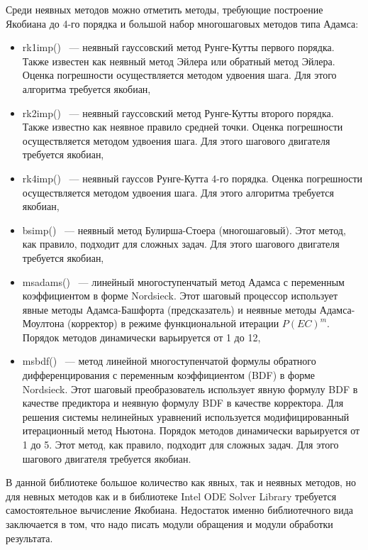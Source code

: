 Среди неявных методов можно отметить методы, требующие построение Якобиана до 4-го порядка и большой набор многошаговых методов типа
Адамса:
\begin{itemize}
    \item rk1imp() ~--- неявный гауссовский метод Рунге-Кутты первого порядка. Также известен как неявный метод Эйлера или обратный
        метод Эйлера. Оценка погрешности осуществляется методом удвоения шага. Для этого алгоритма требуется якобиан,
    \item rk2imp() ~--- неявный гауссовский метод Рунге-Кутты второго порядка. Также известно как неявное правило средней точки. Оценка
        погрешности осуществляется методом удвоения шага. Для этого шагового двигателя требуется якобиан,
    \item rk4imp() ~--- неявный гауссов Рунге-Кутта 4-го порядка. Оценка погрешности осуществляется методом удвоения шага. Для этого
        алгоритма требуется якобиан,
    \item bsimp() ~--- неявный метод Булирша-Стоера (многошаговый). Этот метод, как правило, подходит для сложных задач. Для этого
        шагового двигателя требуется якобиан,
    \item msadams() ~--- линейный многоступенчатый метод Адамса с переменным коэффициентом в форме Nordsieck. Этот шаговый процессор
        использует явные методы Адамса-Башфорта (предсказатель) и неявные методы Адамса-Моултона (корректор) в режиме функциональной
        итерации $P(EC)^m$. Порядок методов динамически варьируется от 1 до 12,
    \item msbdf() ~--- метод линейной многоступенчатой формулы обратного дифференцирования с переменным коэффициентом (BDF) в форме
        Nordsieck. Этот шаговый преобразователь использует явную формулу BDF в качестве предиктора и неявную формулу BDF в качестве
        корректора. Для решения системы нелинейных уравнений используется модифицированный итерационный метод Ньютона. Порядок методов
        динамически варьируется от 1 до 5. Этот метод, как правило, подходит для сложных задач. Для этого шагового двигателя требуется
        якобиан.
\end{itemize}

В данной библиотеке большое количество как явных, так и неявных методов, но для невных методов как и в библиотеке Intel ODE Solver
Library требуется самостоятельное вычисление Якобиана. Недостаток именно библиотечного вида заключается в том, что надо писать модули
обращения и модули обработки результата.

